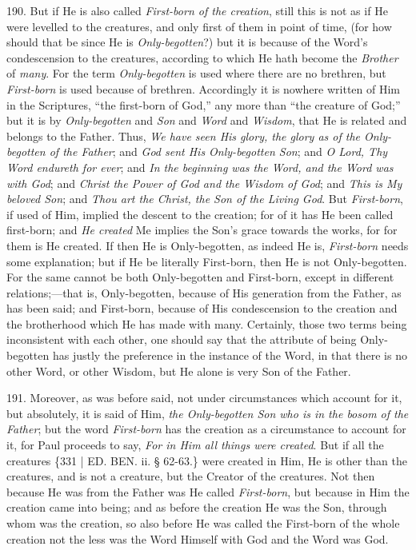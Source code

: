 190. But if He is also called \emph{First-born
of the creation}, still this is not as if He were levelled to the
creatures, and only first of them in point of time, (for how should
that be since He is \emph{Only-begotten}?) but it is because of the
Word's condescension to the creatures, according to which He
hath become the \emph{Brother} of \emph{many}. For the term \emph{Only-begotten}
is used where there are no brethren, but \emph{First-born} is used
because of brethren. Accordingly it is nowhere written of Him in the
Scriptures, ``the first-born of God,'' any more than ``the creature of
God;'' but it is by \emph{Only-begotten} and \emph{Son} and \emph{Word}
and \emph{Wisdom}, that He is related and belongs to the Father. Thus,
\emph{We have seen His glory, the glory as of the Only-begotten of the
Father}; and \emph{God sent His Only-begotten Son}; and \emph{O Lord,
Thy Word endureth for ever}; and \emph{In the beginning was the Word,
and the Word was with God}; and \emph{Christ the Power of God and the
Wisdom of God}; and \emph{This is My beloved Son}; and \emph{Thou art
the Christ, the Son of the Living God}. But \emph{First-born}, if
used of Him, implied the descent to the creation; for of it has He
been called first-born; and \emph{He created} Me implies the Son's
grace towards the works, for for them is He created. If then He is
Only-begotten, as indeed He is, \emph{First-born} needs some
explanation; but if He be literally First-born, then He is not
Only-begotten. For the same cannot be both Only-begotten and
First-born, except in different relations;—that is, Only-begotten,
because of His generation from the Father, as has been said; and
First-born, because of His condescension to the creation and the
brotherhood which He has made with many. Certainly, those two terms
being inconsistent with each other, one should say that the attribute
of being Only-begotten has justly the preference in the instance of
the Word, in that there is no other Word, or other Wisdom, but He
alone is very Son of the Father.

191. Moreover, as was before
said, not under circumstances which account for it, but absolutely, it
is said of Him, \emph{the Only-begotten Son who is in the bosom of the
Father}; but the word \emph{First-born} has the creation as a
circumstance to account for it, for Paul proceeds to say, \emph{For in
Him all things were created}. But if all the creatures \{331 | ED.
BEN. ii. § 62-63.\} were created in Him, He is
other than the creatures, and is not a creature, but the Creator of
the creatures. Not then because He was from the Father was He called \emph{First-born},
but because in Him the creation came into being; and as before the
creation He was the Son, through whom was the creation, so also before
He was called the First-born of the whole creation not the less was
the Word Himself with God and the Word was God.

